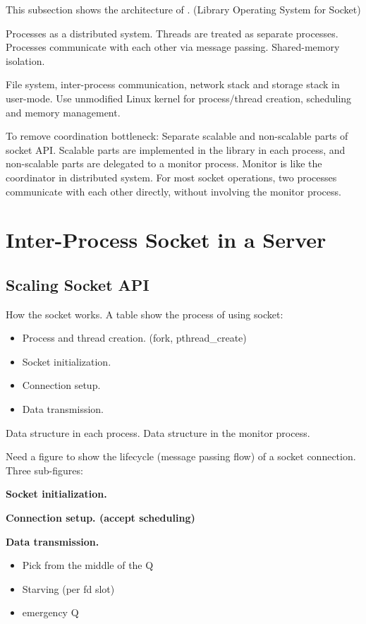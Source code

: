   

This subsection shows the architecture of \sys. (Library Operating System for Socket)

Processes as a distributed system.
Threads are treated as separate processes.
Processes communicate with each other via message passing.
Shared-memory isolation.

File system, inter-process communication, network stack and storage stack in user-mode.
Use unmodified Linux kernel for process/thread creation, scheduling and memory management.

To remove coordination bottleneck:
Separate scalable and non-scalable parts of socket API.
Scalable parts are implemented in the library in each process, and non-scalable parts are delegated to a monitor process.
Monitor is like the coordinator in distributed system.
For most socket operations, two processes communicate with each other directly, without involving the monitor process.



\section{Inter-Process Socket in a Server}
\label{sec:intra-server}

\subsection{Scaling Socket API}
\label{subsec:socket-api}

How the socket works. A table show the process of using socket:

\begin{itemize}
	\item Process and thread creation. (fork, pthread\_create)
	\item Socket initialization.
	\item Connection setup.
	\item Data transmission.
\end{itemize}


Data structure in each process. Data structure in the monitor process.

Need a figure to show the lifecycle (message passing flow) of a socket connection. Three sub-figures:


	 \textbf{Socket initialization.}
	  
	 \textbf{Connection setup. (accept scheduling)}
	 
	 \textbf{Data transmission.}
\begin{itemize}
	\item Pick from the middle of the Q
	\item Starving (per fd slot)
	\item emergency Q
\end{itemize}

